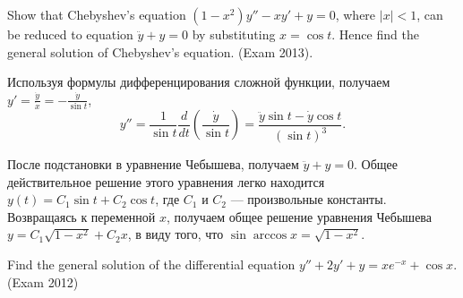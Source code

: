 \begin{problem}
Show that Chebyshev's equation $(1-x^{2} )y''-xy'+y=0$, where $\left|x\right|<1$, can be reduced to equation $\ddot{y}+y=0$ by substituting $x=\cos t$. Hence find the general solution of  Chebyshev's equation. (Exam 2013).
\end{problem}

\begin{solution}
Используя формулы дифференцирования сложной функции, получаем  $y'=\frac{\dot{y}}{\dot{x}}=-\frac{\dot{y}}{\sin t}$,
\[
y''=\frac{1}{\sin t} \frac{d}{dt} \left( \frac{\dot{y}}{\sin t}  \right)=\frac{\ddot{y} \sin t - \dot{y} \cos t }{(\sin t)^3}.
\]

После подстановки в уравнение Чебышева, получаем  $\ddot{y}+y=0$. Общее действительное решение этого уравнения легко находится $y(t)=C_1 \sin t + C_2 \cos t$, где  $C_1$ и  $C_2$ --- произвольные константы. Возвращаясь к переменной $x$, получаем общее решение уравнения Чебышева $y=C_1 \sqrt{1-x^2} + C_2 x$, в виду того, что $\sin \arccos x=\sqrt{1-x^2}$.
\end{solution}


\begin{comment} %
Из замены $x=\cos t$ следует, что $1-x^2=\sin^2 t$, $\dot{y}=y'(-\sin t)$, $\ddot{y}=y'(-\cos t )+y'' \sin^2 t$. 

Если к $\ddot{y}$ прибавить $y$, то мы получим исходное уравнение.

Находим корни характеристического уравнения $\lambda=\pm i$. Отсюда общее решение, как функция от $t$, имеет вид

\[
y(t)=C_1 \cos t + C_2 \sin t
\]

В данном случае $t=\pm \arccos x + 2\pi k$. После подстановки получаем:
\[
y(x)=C_1 \cos(\arccos x) + C_2 \sin (\arccos x)= C_1 x + C_2 \sqrt{1-x^2}
\]
\end{comment}






\begin{problem}
Find the general solution of the differential equation $y''+2y'+y=xe^{-x} +\cos x$. (Exam 2012)
\end{problem}

